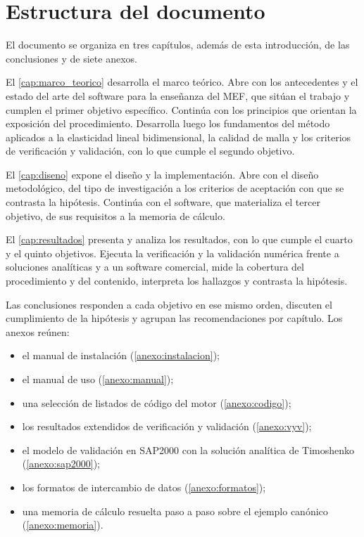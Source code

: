 \section*{Estructura del documento}

El documento se organiza en tres capítulos, además de esta introducción, de las conclusiones y de siete anexos.

El \autoref{cap:marco_teorico} desarrolla el marco teórico. Abre con los antecedentes y el estado del arte del software para la enseñanza del MEF, que sitúan el trabajo y cumplen el primer objetivo específico. Continúa con los principios que orientan la exposición del procedimiento. Desarrolla luego los fundamentos del método aplicados a la elasticidad lineal bidimensional, la calidad de malla y los criterios de verificación y validación, con lo que cumple el segundo objetivo.

El \autoref{cap:diseno} expone el diseño y la implementación. Abre con el diseño metodológico, del tipo de investigación a los criterios de aceptación con que se contrasta la hipótesis. Continúa con el software, que materializa el tercer objetivo, de sus requisitos a la memoria de cálculo.

El \autoref{cap:resultados} presenta y analiza los resultados, con lo que cumple el cuarto y el quinto objetivos. Ejecuta la verificación y la validación numérica frente a soluciones analíticas y a un software comercial, mide la cobertura del procedimiento y del contenido, interpreta los hallazgos y contrasta la hipótesis.

Las conclusiones responden a cada objetivo en ese mismo orden, discuten el cumplimiento de la hipótesis y agrupan las recomendaciones por capítulo. Los anexos reúnen:
\begin{itemize}
    \item el manual de instalación (\autoref{anexo:instalacion});
    \item el manual de uso (\autoref{anexo:manual});
    \item una selección de listados de código del motor (\autoref{anexo:codigo});
    \item los resultados extendidos de verificación y validación (\autoref{anexo:vyv});
    \item el modelo de validación en SAP2000 con la solución analítica de Timoshenko (\autoref{anexo:sap2000});
    \item los formatos de intercambio de datos (\autoref{anexo:formatos});
    \item una memoria de cálculo resuelta paso a paso sobre el ejemplo canónico (\autoref{anexo:memoria}).
\end{itemize}


